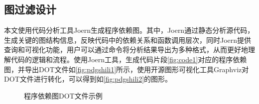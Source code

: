 \subsection{图过滤设计}
\label{subsec:PDGPreModel}

本文使用代码分析工具Joern生成程序依赖图。其中，Joern通过静态分析源代码，生成关键的图结构信息，反映代码中的依赖关系和函数调用层次，同时Joern提供查询和可视化功能，用户可以通过命令将分析结果导出为多种格式，从而更好地理解代码的逻辑和流程。使用Joern工具，生成代码片段\ref{fig:code1}对应的程序依赖图，并导出DOT文件如\ref{fig:pdgshili1}所示，使用开源图形可视化工具Graphviz对DOT文件进行转化，可以得到如\ref{fig:pdgshili2}的图形。

\begin{figure}[H]
  \centering
  \caption{程序依赖图DOT文件示例}
  \label{fig:pdgshili}
\end{figure}
